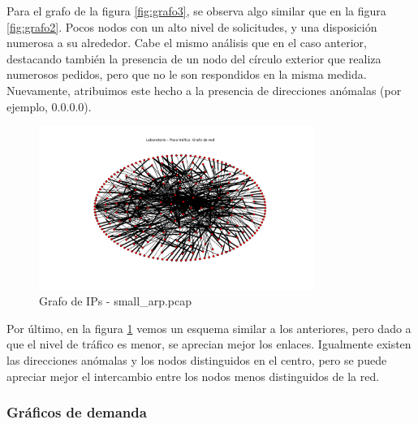 Para el grafo de la figura \ref{fig:grafo3}, se observa algo similar que en la figura \ref{fig:grafo2}. Pocos nodos con un alto nivel de solicitudes, y una disposición numerosa a su alrededor. Cabe el mismo análisis que en el caso anterior, destacando también la presencia de un nodo del círculo exterior que realiza numerosos pedidos, pero que no le son respondidos en la misma medida. Nuevamente, atribuimos este hecho a la presencia de direcciones anómalas (por ejemplo, $0.0.0.0$).

\begin{figure}[h!]
  \centering
    \includegraphics[width=0.8\textwidth]{graficos/grafoLaboSmall.png}
    \caption{Grafo de IPs - small\_arp.pcap}
    \label{fig:grafo4}
\end{figure}

Por último, en la figura \ref{fig:grafo4} vemos un esquema similar a los anteriores, pero dado a que el nivel de tráfico es menor, se aprecian mejor los enlaces. Igualmente existen las direcciones anómalas y los nodos distinguidos en el centro, pero se puede apreciar mejor el intercambio entre los nodos menos distinguidos de la red.

\subsubsection{Gr\'aficos de demanda}  %

